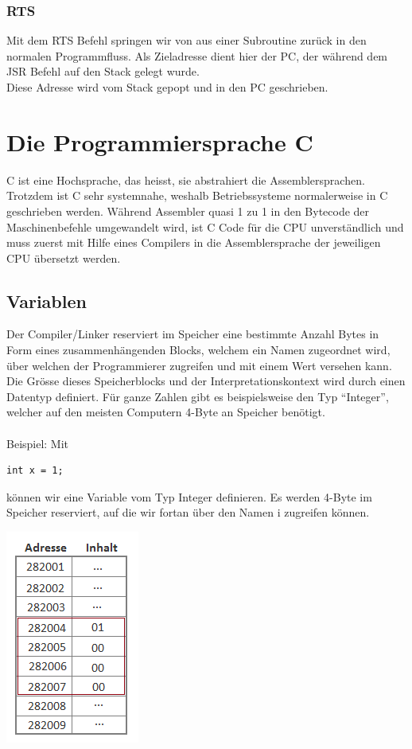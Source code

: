 \documentclass[a4paper,10pt]{report}
\begin{document}
\subsection{RTS}
Mit dem RTS Befehl springen wir von aus einer Subroutine zurück in den normalen Programmfluss.
Als Zieladresse dient hier der PC, der während dem JSR Befehl auf den Stack gelegt wurde.\\
Diese Adresse wird vom Stack gepopt und in den PC geschrieben.
\newpage
\chapter{Die Programmiersprache C}
C ist eine Hochsprache, das heisst, sie abstrahiert die Assemblersprachen. Trotzdem ist C sehr systemnahe, weshalb Betriebssysteme normalerweise in C geschrieben werden. Während Assembler quasi 1 zu 1 in den Bytecode der Maschinenbefehle umgewandelt wird, ist C Code für die CPU unverständlich und muss zuerst mit Hilfe eines Compilers in die Assemblersprache der jeweiligen CPU übersetzt werden.
\section{Variablen}Der Compiler/Linker reserviert im Speicher eine bestimmte Anzahl Bytes in Form eines zusammenhängenden Blocks, welchem ein Namen zugeordnet wird, über welchen der Programmierer zugreifen und mit einem Wert versehen kann. Die Grösse dieses Speicherblocks und der Interpretationskontext wird durch einen Datentyp definiert. Für ganze Zahlen gibt es beispielsweise den Typ "`Integer"', welcher auf den meisten Computern 4-Byte an Speicher benötigt.\\\\ Beispiel: Mit
\begin{lstlisting}[]
int x = 1;
\end{lstlisting}
können wir eine Variable vom Typ Integer definieren. Es werden 4-Byte im Speicher reserviert, auf die wir fortan über den Namen i zugreifen können. 
\begin{center}\includegraphics[scale=0.85]{imgs/c-variablen.png}\end{center}
\end{document}
